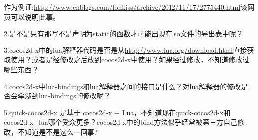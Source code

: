 作为例证:\url{http://www.cnblogs.com/lonkiss/archive/2012/11/17/2775440.html}该网页可以说明此事。

2.是不是只有那写不是声明为static的函数才可能出现在.so文件的导出表中呢？

3.cocos2d-x中的lua解释器代码是否是从\url{http://www.lua.org/download.html}直接获取使用？或者是经修改之后放到cocos2d-x中使用？如果经过修改，不知道修改过哪些东西？

4.cocos2d-x中lua-bindings和lua解释器之间的接口是什么？对lua解释器的修改是否会牵涉到lua-bindings的修改呢？

5.quick-cocos2d-x 是基于 cocos2d-x + Lua，不知道现在quick-cocos2d-x和cocos2d-x+lua哪个受众更多？cocos2d-x中的bind方法似乎经常被第三方自己修改，不知道是不是这么一回事?
